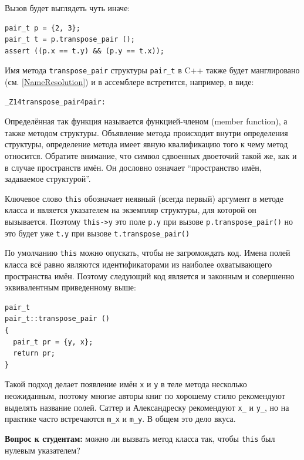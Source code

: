 \documentclass[a4paper,12pt,oneside]{article}
\begin{document}
Вызов будет выглядеть чуть иначе:

\begin{lstlisting}
pair_t p = {2, 3};
pair_t t = p.transpose_pair ();
assert ((p.x == t.y) && (p.y == t.x));
\end{lstlisting}

Имя метода \lstinline!transpose_pair! структуры \lstinline!pair_t! в C++ также будет манглировано (см. \ref{NameResolution}) и в ассемблере встретится, например, в виде:

\begin{verbatim}
_Z14transpose_pair4pair:
\end{verbatim}

Определённая так функция называется функцией-членом (member function), а также методом структуры. Объявление метода происходит внутри определения структуры, определение метода имеет явную квалификацию того к чему метод относится. Обратите внимание, что символ сдвоенных двоеточий такой же, как и в случае пространств имён. Он дословно означает ``пространство имён, задаваемое структурой''.

Ключевое слово \lstinline!this! обозначает неявный (всегда первый) аргумент в методе класса и является указателем на экземпляр структуры, для которой он вызывается. Поэтому \lstinline!this->y! это поле \lstinline!p.y! при вызове \lstinline!p.transpose_pair()! но это будет уже \lstinline!t.y! при вызове \lstinline!t.transpose_pair()!

По умолчанию \lstinline!this! можно опускать, чтобы не загромождать код. Имена полей класса всё равно являются идентификаторами из наиболее охватывающего пространства имён. Поэтому следующий код является и законным и совершенно эквивалентным приведенному выше:

\begin{lstlisting}
pair_t 
pair_t::transpose_pair ()
{
  pair_t pr = {y, x};
  return pr;
} 
\end{lstlisting}

Такой подход делает появление имён \lstinline!x! и \lstinline!y! в теле метода несколько неожиданным, поэтому многие авторы книг по хорошему стилю рекомендуют выделять название полей. Саттер и Александреску \cite{sutteralexandresku} рекомендуют \lstinline!x_! и \lstinline!y_!, но на практике часто встречаются \lstinline!m_x! и \lstinline!m_y!. В общем это дело вкуса.

\textbf{Вопрос к студентам:} можно ли вызвать метод класса так, чтобы \lstinline!this! был нулевым указателем?
\end{document}
